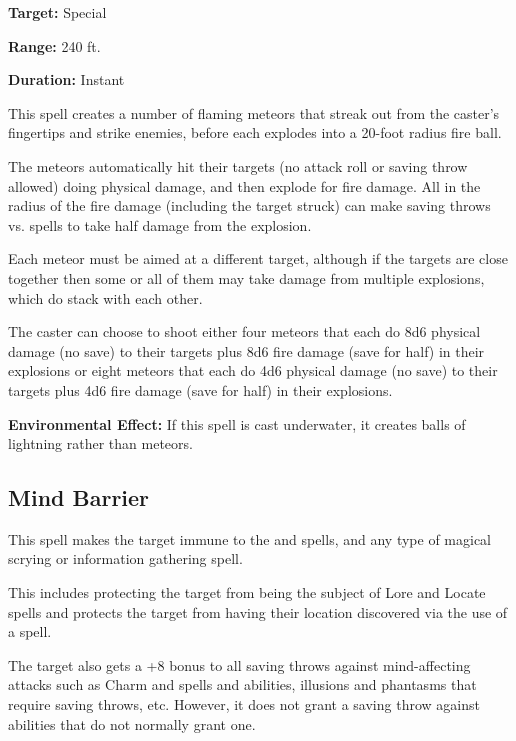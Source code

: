 \begin{multicols*}{2}
{\textbf{Target:} Special

\textbf{Range:} 240 ft.

\textbf{Duration:} Instant}

This spell creates a number of flaming meteors that streak out from the caster’s fingertips and strike enemies, before each explodes into a 20-foot radius fire ball.

The meteors automatically hit their targets (no attack roll or saving throw allowed) doing physical damage, and then explode for fire damage. All in the radius of the fire damage (including the target struck) can make saving throws vs. spells to take half damage from the explosion.

Each meteor must be aimed at a different target, although if the targets are close together then some or all of them may take damage from multiple explosions, which do stack with each other.

The caster can choose to shoot either four meteors that each do 8d6 physical damage (no save) to their targets plus 8d6 fire damage (save for half) in their explosions or eight meteors that each do 4d6 physical damage (no save) to their targets plus 4d6 fire damage (save for half) in their explosions.

\textbf{Environmental Effect:} If this spell is cast underwater, it creates balls of lightning rather than meteors.

\subsection{Mind Barrier}\label{spell:Mind Barrier}

This spell makes the target immune to the  and  spells, and any type of magical scrying or information gathering spell.

This includes protecting the target from being the subject of Lore and Locate spells and protects the target from having their location discovered via the use of a  spell.

The target also gets a +8 bonus to all saving throws against mind-affecting attacks such as Charm and  spells and abilities, illusions and phantasms that require saving throws, etc. However, it does not grant a saving throw against abilities that do not normally grant one.


\end{multicols*}
